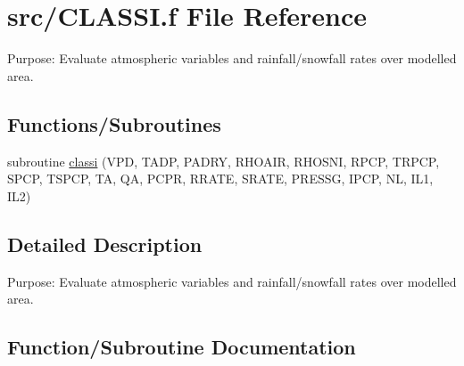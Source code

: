 \hypertarget{CLASSI_8f}{}\section{src/\+C\+L\+A\+S\+S\+I.f File Reference}
\label{CLASSI_8f}


Purpose\+: Evaluate atmospheric variables and rainfall/snowfall rates over modelled area.  


\subsection*{Functions/\+Subroutines}
\begin{DoxyCompactItemize}
\item 
subroutine \hyperlink{CLASSI_8f_a4e0212f4e58542e09cc303c2a0054949}{classi} (V\+P\+D, T\+A\+D\+P, P\+A\+D\+R\+Y, R\+H\+O\+A\+I\+R, R\+H\+O\+S\+N\+I, R\+P\+C\+P, T\+R\+P\+C\+P, S\+P\+C\+P, T\+S\+P\+C\+P, T\+A, Q\+A, P\+C\+P\+R, R\+R\+A\+T\+E, S\+R\+A\+T\+E, P\+R\+E\+S\+S\+G, I\+P\+C\+P, N\+L, I\+L1, I\+L2)
\end{DoxyCompactItemize}


\subsection{Detailed Description}
Purpose\+: Evaluate atmospheric variables and rainfall/snowfall rates over modelled area. 



\subsection{Function/\+Subroutine Documentation}
\hypertarget{CLASSI_8f_a4e0212f4e58542e09cc303c2a0054949}{}

